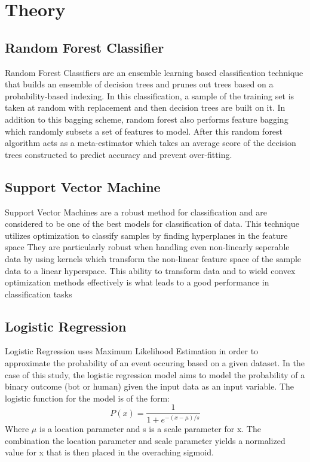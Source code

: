 \documentclass[12pt]{article}
\begin{document}
\section{Theory}
\subsection{Random Forest Classifier}
Random Forest Classifiers are an ensemble learning based classification technique that builds an ensemble of decision trees and prunes out trees based on a probability-based indexing. In this classification, a sample of the training set is taken at random with replacement and then decision trees are built on it. In addition to this bagging scheme, random forest also performs feature bagging which randomly subsets a set of features to model. After this random forest algorithm acts as a meta-estimator which takes an average score of the decision trees constructed to predict accuracy and prevent over-fitting.

\subsection{Support Vector Machine}
Support Vector Machines are a robust method for classification and are considered to be one of the best models for classification of data. This technique utilizes optimization to classify samples by finding hyperplanes in the feature space  They are particularly robust when handling even non-linearly seperable data by using kernels which transform the non-linear feature space of the sample data to a linear hyperspace. This ability to transform data and to wield convex optimization methods effectively is what leads to a good performance in classification tasks

\subsection{Logistic Regression}
Logistic Regression uses Maximum Likelihood Estimation in order to approximate the probability of an event occuring based on a given dataset. In the case of this study, the logistic regression model aims to model the probability of a binary outcome (bot or human) given the input data as an input variable. The logistic function for the model is of the form:
\begin{equation}
	P(x) = \frac{1}{1+e^{-(x-\mu)/s}}
\end{equation}
Where $\mu$ is a location parameter and s is a scale parameter for x. The combination the location parameter and scale parameter yields a normalized value for x that is then placed in the overaching sigmoid. 
\end{document}
